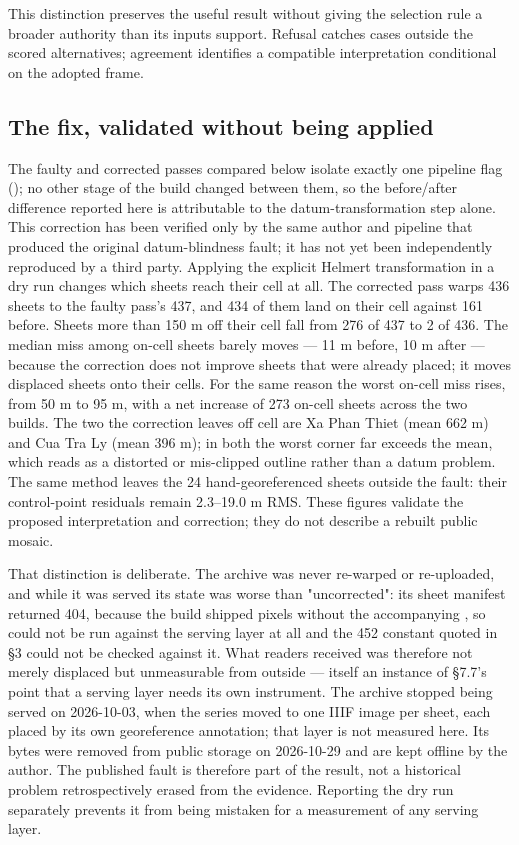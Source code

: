 \documentclass[11pt,a4paper]{article}
\begin{document}
This distinction preserves the useful result without giving the selection rule a broader authority than its inputs support. Refusal catches cases outside the scored alternatives; agreement identifies a compatible interpretation conditional on the adopted frame.

\subsection{The fix, validated without being applied}

The faulty and corrected passes compared below isolate exactly one pipeline flag (\texttt{}); no other stage of the build changed between them, so the before/after difference reported here is attributable to the datum-transformation step alone. This correction has been verified only by the same author and pipeline that produced the original datum-blindness fault; it has not yet been independently reproduced by a third party. Applying the explicit Helmert transformation in a dry run changes which sheets reach their cell at all. The corrected pass warps 436 sheets to the faulty pass's 437, and 434 of them land on their cell against 161 before. Sheets more than 150 m off their cell fall from 276 of 437 to 2 of 436. The median miss among on-cell sheets barely moves — 11 m before, 10 m after — because the correction does not improve sheets that were already placed; it moves displaced sheets onto their cells. For the same reason the worst on-cell miss rises, from 50 m to 95 m, with a net increase of 273 on-cell sheets across the two builds. The two the correction leaves off cell are \texttt{} Xa Phan Thiet (mean 662 m) and \texttt{} Cua Tra Ly (mean 396 m); in both the worst corner far exceeds the mean, which reads as a distorted or mis-clipped outline rather than a datum problem. The same method leaves the 24 hand-georeferenced sheets outside the fault: their control-point residuals remain 2.3–19.0 m RMS. These figures validate the proposed interpretation and correction; they do not describe a rebuilt public mosaic.

That distinction is deliberate. The \texttt{} archive was never re-warped or re-uploaded, and while it was served its state was worse than "uncorrected": its sheet manifest returned 404, because the build shipped pixels without the accompanying \texttt{}, so \texttt{} could not be run against the serving layer at all and the 452 constant quoted in §3 could not be checked against it. What readers received was therefore not merely displaced but unmeasurable from outside — itself an instance of §7.7's point that a serving layer needs its own instrument. The archive stopped being served on 2026-10-03, when the series moved to one IIIF image per sheet, each placed by its own georeference annotation; that layer is not measured here. Its bytes were removed from public storage on 2026-10-29 and are kept offline by the author. The published fault is therefore part of the result, not a historical problem retrospectively erased from the evidence. Reporting the dry run separately prevents it from being mistaken for a measurement of any serving layer.
\end{document}
